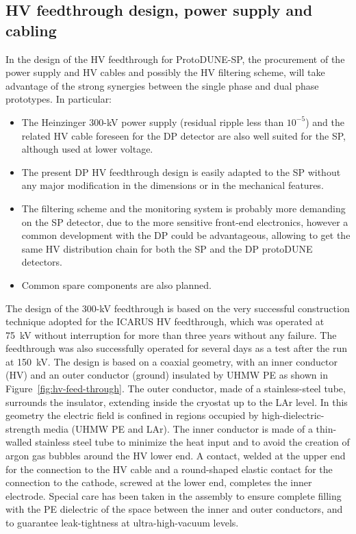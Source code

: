 
\subsection{HV feedthrough design, power supply and cabling}
In the design of the HV feedthrough for ProtoDUNE-SP, the procurement of the power supply and HV cables and possibly the HV filtering scheme, will take advantage of the strong synergies between the single phase and dual phase prototypes. In particular:

\begin{itemize}	
\item The Heinzinger 300-kV power supply (residual ripple less than $10^{-5}$) and the related HV cable foreseen for the DP detector are also well suited for the SP, although used at lower voltage.
\item The present DP HV feedthrough design is easily adapted to the SP without any major modification in the dimensions or in the mechanical features.
\item The filtering scheme and the monitoring system is probably more demanding on the SP detector, due to the more sensitive front-end electronics, however a common development with the DP could be advantageous, allowing to get the same HV distribution chain for both the SP and the DP protoDUNE detectors.
\item Common spare components are also planned. %
\end{itemize}

The %
design of the 300-kV feedthrough is based on the very successful construction technique adopted for the ICARUS HV feedthrough, which was operated at 75~kV without interruption for more than three years without any failure. The feedthrough was also successfully operated for several days as a test after the run at 150~kV.  
The design is based on a coaxial geometry, with an inner conductor (HV) and an outer conductor (ground) insulated by UHMW PE  as shown in Figure~\ref{fig:hv-feed-through}. The outer conductor, made of a stainless-steel tube, surrounds the insulator, extending inside the cryostat up to the LAr level. %
In this geometry the electric field is %
confined in regions occupied by high-dielectric-strength media (UHMW PE and LAr).  The inner conductor is made of a thin-walled stainless steel tube to minimize the heat input and to avoid the creation of argon gas bubbles around the HV lower end. A contact, welded at the upper end for the
connection to the HV cable and a round-shaped elastic contact for the connection to the cathode, screwed at the lower end, completes the inner electrode. Special care has been taken in the assembly to ensure complete filling with the PE dielectric of the space between the inner and outer conductors, and to guarantee leak-tightness at ultra-high-vacuum levels.


